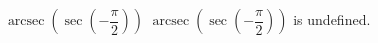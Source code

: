  {$\operatorname{arcsec}\left(\sec\left(-\dfrac{\pi}{2} \right) \right)$}
{ $\operatorname{arcsec}\left(\sec\left(-\dfrac{\pi}{2} \right) \right)$ is undefined. }
